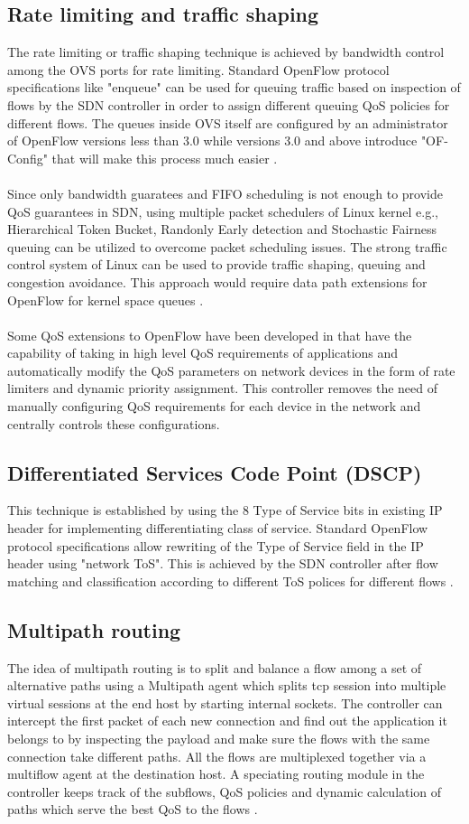 \documentclass[paper=a4, fontsize=12pt]{scrartcl}	%
\numberwithin{equation}{section}		%
\numberwithin{figure}{section}			%
\numberwithin{table}{section}				%
\begin{document}
\subsection{Rate limiting and traffic shaping}
The rate limiting or traffic shaping technique is achieved by bandwidth control among the OVS ports for rate limiting. Standard OpenFlow protocol specifications like "enqueue" can be used for queuing traffic based on inspection of flows by the SDN controller in order to assign different queuing QoS policies for different flows. The queues inside OVS itself are configured by an administrator of OpenFlow versions less than 3.0 while versions 3.0 and above introduce "OF-Config" that will make this process much easier \cite{bigswitch}. 
\\
\\
Since only bandwidth guaratees and FIFO scheduling is not enough to provide QoS guarantees in SDN, using multiple packet schedulers of Linux kernel e.g., Hierarchical Token Bucket, Randonly Early detection and Stochastic Fairness queuing can be utilized to overcome packet scheduling issues. The strong traffic control system of Linux can be used to provide traffic shaping, queuing and congestion avoidance. This approach would require data path extensions for OpenFlow for kernel space queues \cite{scheduler}.
\\
\\
Some QoS extensions to OpenFlow have been developed in \cite{convergence} that have the capability of taking in high level QoS requirements of applications and automatically modify the QoS parameters on network devices in the form of rate limiters and dynamic priority assignment. This controller removes the need of manually configuring QoS requirements for each device in the network and centrally controls these configurations. 
\subsection{Differentiated Services Code Point (DSCP)}
This technique is established by using the 8 Type of Service bits in existing IP header for implementing differentiating class of service. Standard OpenFlow protocol specifications allow rewriting of the Type of Service field in the IP header using "network ToS". This is achieved by the SDN controller after flow matching and classification according to different ToS polices for different flows \cite{bigswitch}.
\subsection{Multipath routing}
The idea of multipath routing is to split and balance a flow among a set of alternative paths using a Multipath agent which splits tcp session into multiple virtual sessions at the end host by starting internal sockets. The controller can intercept the first packet of each new connection and find out the application it belongs to by inspecting the payload and make sure the flows with the same connection take different paths. All the flows are multiplexed together via a multiflow agent at the destination host. A speciating routing module in the controller keeps track of the subflows, QoS policies and dynamic calculation of paths which serve the best QoS to the flows \cite{multipath}.
\end{document}
